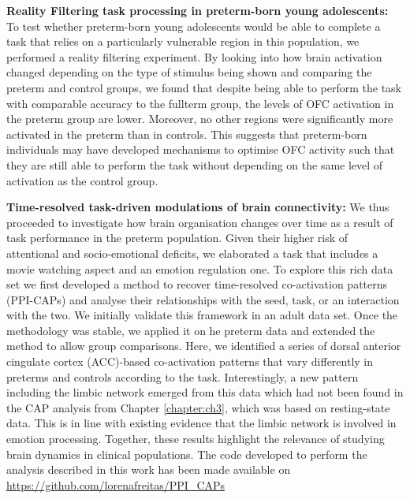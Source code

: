 \textbf{Reality Filtering task processing in preterm-born young adolescents:} To test whether pre\-term-born young adolescents would be able to complete a task that relies on a particularly vulnerable region in this population, we performed a reality filtering experiment. By looking into how brain activation changed depending on the type of stimulus being shown and comparing the preterm and control groups, we found that despite being able to perform the task with comparable accuracy to the fullterm group, the levels of OFC activation in the preterm group are lower. Moreover, no other regions were significantly more activated in the preterm than in controls. This suggests that preterm-born individuals may have developed mechanisms to optimise OFC activity such that they are still able to perform the task without depending on the same level of activation as the control group.





\textbf{Time-resolved task-driven modulations of brain connectivity:}
We thus proceeded to investigate how brain organisation changes over time as a result of task performance in the preterm population. Given their higher risk of attentional and socio-emotional deficits, we elaborated a task that includes a movie watching aspect and an emotion regulation one. To explore this rich data set we first developed a method to recover time-resolved co-activation patterns (PPI-CAPs) and analyse their relationships with the seed, task, or an interaction with the two. We initially validate this framework in an adult data set. Once the methodology was stable, we applied it on he preterm data and extended the method to allow group comparisons. Here, we identified a series of dorsal anterior cingulate cortex (ACC)-based co-activation patterns that vary differently in preterms and controls according to the task. Interestingly, a new pattern including the limbic network emerged from this data which had not been found in the CAP analysis from Chapter \ref{chapter:ch3}, which was based on resting-state data. This is in line with existing evidence that the limbic network is involved in emotion processing. Together, these results highlight the relevance of studying brain dynamics in clinical populations. The code developed to perform the analysis described in this work has been made available on \url{https://github.com/lorenafreitas/PPI_CAPs}









